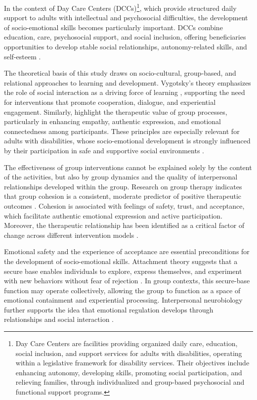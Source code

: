\documentclass[12pt,a4paper]{article}
\begin{document}
In the context of Day Care Centers (DCCs)\footnote{Day Care Centers are facilities providing organized daily care, education, social inclusion, and support services for adults with disabilities, operating within a legislative framework for disability services. Their objectives include enhancing autonomy, developing skills, promoting social participation, and relieving families, through individualized and group-based psychosocial and functional support programs.}, which provide structured daily support to adults with intellectual and psychosocial difficulties, the development of socio-emotional skills becomes particularly important. DCCs combine education, care, psychosocial support, and social inclusion, offering beneficiaries opportunities to develop stable social relationships, autonomy-related skills, and self-esteem \parencite{westmore2024}.

The theoretical basis of this study draws on socio-cultural, group-based, and relational approaches to learning and development. Vygotsky's theory emphasizes the role of social interaction as a driving force of learning \parencite{vygotsky1978}, supporting the need for interventions that promote cooperation, dialogue, and experiential engagement. Similarly, \textcite{yalom2005} highlight the therapeutic value of group processes, particularly in enhancing empathy, authentic expression, and emotional connectedness among participants. These principles are especially relevant for adults with disabilities, whose socio-emotional development is strongly influenced by their participation in safe and supportive social environments \parencite{shogren2017}.

The effectiveness of group interventions cannot be explained solely by the content of the activities, but also by group dynamics and the quality of interpersonal relationships developed within the group. Research on group therapy indicates that group cohesion is a consistent, moderate predictor of positive therapeutic outcomes \parencite{burlingame2011}. Cohesion is associated with feelings of safety, trust, and acceptance, which facilitate authentic emotional expression and active participation. Moreover, the therapeutic relationship has been identified as a critical factor of change across different intervention models \parencite{norcross2018,wampold2015}.

Emotional safety and the experience of acceptance are essential preconditions for the development of socio-emotional skills. Attachment theory suggests that a secure base enables individuals to explore, express themselves, and experiment with new behaviors without fear of rejection \parencite{bowlby1988}. In group contexts, this secure-base function may operate collectively, allowing the group to function as a space of emotional containment and experiential processing. Interpersonal neurobiology further supports the idea that emotional regulation develops through relationships and social interaction \parencite{siegel2012,schore2012}.
\end{document}
